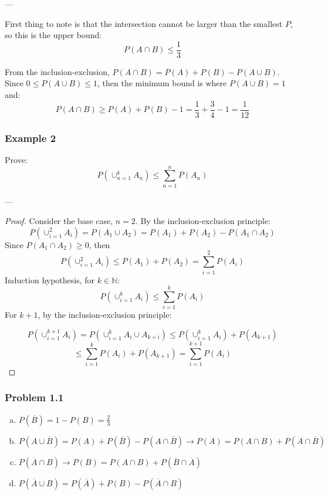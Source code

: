\documentclass{report}
\begin{document}
---

First thing to note is that the intersection cannot be larger than the smallest $P$, so this is the upper bound: $$P(A \cap B) \leq \frac{1}{3}$$

From the inclusion-exclusion, $P(A \cap B) = P(A) + P(B) - P(A \cup B)$. Since $0 \leq P(A \cup B) \leq 1$, then the minimum bound is where $P(A \cup B) = 1$ and: $$P(A \cap B) \geq P(A) + P(B) - 1 = \frac{1}{3} + \frac{3}{4} - 1 = \frac{1}{12}$$


\subsubsection*{Example 2}

Prove: $$P(\cup_{n=1}^k A_n) \leq \sum_{n=1}^{n} P(A_n)$$

---

\begin{proof}[Proof]

Consider the base case, $n=2$. By the inclusion-exclusion principle:
$$P(\cup_{i=1}^2 A_i) = P(A_1 \cup A_2) = P(A_1) + P(A_2) - P(A_1 \cap A_2)$$
Since $P(A_1 \cap A_2) \geq 0$, then  $$P(\cup_{i=1}^2 A_i) \leq P(A_1) + P(A_2) 
 = \sum_{i=1}^{2} P(A_i)$$
Induction hypothesis, for $k \in \mathbb{N}$: $$P(\cup_{i=1}^k A_i) \leq \sum_{i=1}^{k} P(A_i)$$
For $k+1$, by the inclusion-exclusion principle:


$$P ( \cup_{i=1}^{k+1} A_i ) = P(\cup^k_{i=1} A_i \cup A_{k+i}) \leq P(\cup_{i=1}^k A_i) + P(A_{k+1})$$ $$ \leq \sum_{i=1}^k P(A_i) + P(A_{k+1}) = \sum_{i=1}^{k+1} P(A_i) $$
  
\end{proof}

\subsubsection*{Problem 1.1}

\begin{enumerate}[(a)]

\item $P(\overline{B}) = 1 - P(B) = \frac{2}{3}$

\item $P(A \cup \overline{B}) = P(A) + P(\overline{B}) - P(A \cap \overline{B}) \rightarrow P(A) = P(A \cap B) + P(A \cap \overline{B})$

\item $P(\overline{A} \cap B) \rightarrow P(B) = P(A \cap B) + P(\overline{B} \cap \overline{A})$

\item $P(\overline{A} \cup B) = P(\overline{A}) + P(B) - P(\overline{A} \cap B)$

\end{enumerate}
\end{document}
